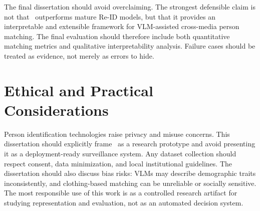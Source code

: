 The final dissertation should avoid overclaiming. The strongest defensible claim is not that \systemname\ outperforms mature Re-ID models, but that it provides an interpretable and extensible framework for VLM-assisted cross-media person matching. The final evaluation should therefore include both quantitative matching metrics and qualitative interpretability analysis. Failure cases should be treated as evidence, not merely as errors to hide.

\section{Ethical and Practical Considerations}

Person identification technologies raise privacy and misuse concerns. This dissertation should explicitly frame \systemname\ as a research prototype and avoid presenting it as a deployment-ready surveillance system. Any dataset collection should respect consent, data minimization, and local institutional guidelines. The dissertation should also discuss bias risks: VLMs may describe demographic traits inconsistently, and clothing-based matching can be unreliable or socially sensitive. The most responsible use of this work is as a controlled research artifact for studying representation and evaluation, not as an automated decision system.

